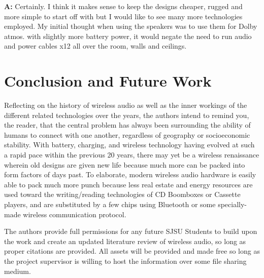 \documentclass[conference]{IEEEtran}
\begin{document}
\textbf{A:} Certainly. I think it makes sense to keep the designs cheaper, rugged and more
simple to start off with but I would like to see many more technologies employed.
My initial thought when using the speakers was to use them for Dolby atmos. with slightly
more battery power, it would negate the need to run audio and power cables x12 all over the
room, walls and ceilings. \cite{wynne_interviewing_2023}

\section*{Conclusion and Future Work}

Reflecting on the history of wireless audio as well as the inner workings of the different
related technologies over the years, the authors intend to remind you, the reader, that the
central problem has always been surrounding the ability of humans to connect with one
another, regardless of geography or socioeconomic stability. With battery, charging, and
wireless technology having evolved at such a rapid pace within the previous 20 years, there
may yet be a wireless renaissance wherein old designs are given new life because much more
can be packed into form factors of days past. To elaborate, modern wireless audio hardware is
easily able to pack much more punch because less real estate and energy resources are used
toward the writing/reading technologies of CD Boomboxes or Cassette players, and are
substituted by a few chips using Bluetooth or some specially-made wireless communication
protocol.

The authors provide full permissions for any future SJSU Students to build upon the work and
create an updated literature review of wireless audio, so long as proper citations are
provided. All assets will be provided and made free so long as the project supervisor is
willing to host the information over some file sharing medium.

\vfill



\vspace{12pt}
\end{document}
